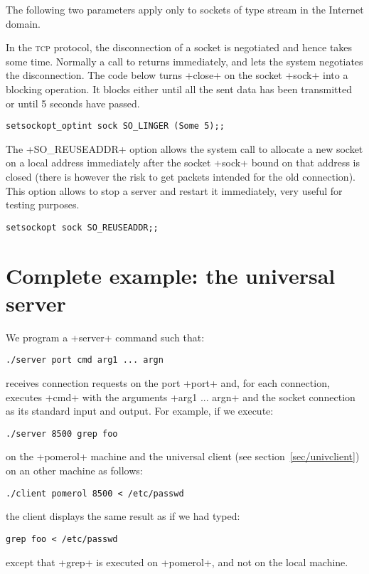 \begin{example} 
The following two parameters apply only to sockets of type stream in the
Internet domain.

In the \textsc{tcp} protocol, the disconnection of a socket is
negotiated and hence takes some time.  Normally a call to
 returns immediately, and lets the system
negotiates the disconnection. The code below turns \ml+close+ on the
socket \ml+sock+ into a blocking operation. It blocks either
until all the sent data has been transmitted or until 5 seconds have
passed.
%
\begin{lstlisting}
setsockopt_optint sock SO_LINGER (Some 5);;
\end{lstlisting}
%

The \ml+SO_REUSEADDR+ option allows the  system call
to allocate a new socket on a local address immediately after the
socket \ml+sock+ bound on that address is closed (there is however the
risk to get packets intended for the old connection). This option
allows to stop a server and restart it immediately, very useful for
testing purposes.
%
\begin{lstlisting}
setsockopt sock SO_REUSEADDR;;
\end{lstlisting}
\end{example}

\section{Complete example: the universal server}

We program a \ml+server+ command such that:
%
\begin{lstlisting}
./server port cmd arg1 ... argn
\end{lstlisting}
% 
receives connection requests on the port \ml+port+ and, for each
connection, executes \ml+cmd+ with the arguments \ml+arg1 ... argn+
and the socket connection as its standard input and output. For
example, if we execute:
%
\begin{lstlisting}
./server 8500 grep foo
\end{lstlisting}
%
on the \ml+pomerol+ machine and the universal client (see
section~\ref{sec/univclient}) on an other machine as follows:
%
\begin{lstlisting}
./client pomerol 8500 < /etc/passwd
\end{lstlisting}
%
the client displays the same result as if we had typed:
%
\begin{lstlisting}
grep foo < /etc/passwd
\end{lstlisting}
%
except that \ml+grep+ is executed on \ml+pomerol+, and not on the local machine.

